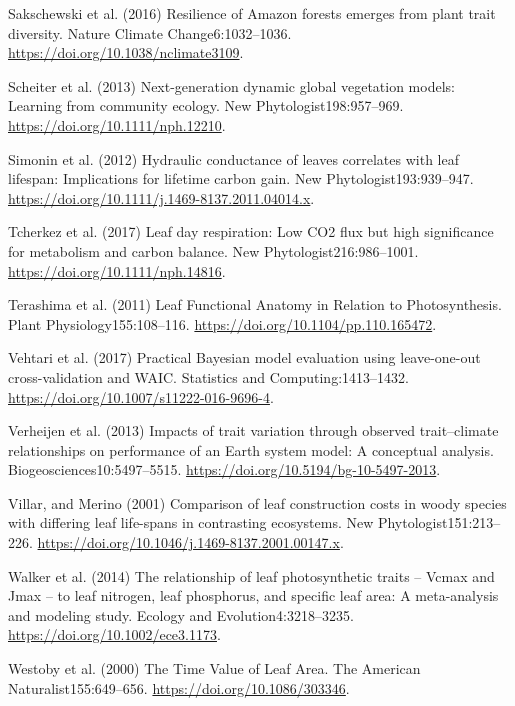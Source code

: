 \documentclass[
  12pt,
  letterpaper,
  DIV=11,
  numbers=noendperiod]{scrartcl}
\newlength{\cslhangindent}
\newenvironment{CSLReferences}[2] %
 {\begin{list}{}{%
  \setlength{\itemindent}{0pt}
  \setlength{\leftmargin}{0pt}
  \setlength{\parsep}{0pt}
  \ifodd #1
   \setlength{\leftmargin}{\cslhangindent}
   \setlength{\itemindent}{-1\cslhangindent}
  \fi
  \setlength{\itemsep}{#2\baselineskip}}}
 {\end{list}}
\begin{document}
\begin{CSLReferences}{1}{1}
Sakschewski et al. (2016) Resilience of {Amazon} forests emerges from
plant trait diversity. Nature Climate Change6:1032--1036.
\url{https://doi.org/10.1038/nclimate3109}.

Scheiter et al. (2013) Next-generation dynamic global vegetation models:
{Learning} from community ecology. New Phytologist198:957--969.
\url{https://doi.org/10.1111/nph.12210}.

Simonin et al. (2012) Hydraulic conductance of leaves correlates with
leaf lifespan: {Implications} for lifetime carbon gain. New
Phytologist193:939--947.
\url{https://doi.org/10.1111/j.1469-8137.2011.04014.x}.

Tcherkez et al. (2017) Leaf day respiration: Low {CO2} flux but high
significance for metabolism and carbon balance. New
Phytologist216:986--1001. \url{https://doi.org/10.1111/nph.14816}.

Terashima et al. (2011) Leaf {Functional Anatomy} in {Relation} to
{Photosynthesis}. Plant Physiology155:108--116.
\url{https://doi.org/10.1104/pp.110.165472}.

Vehtari et al. (2017) Practical {Bayesian} model evaluation using
leave-one-out cross-validation and {WAIC}. Statistics and
Computing:1413--1432. \url{https://doi.org/10.1007/s11222-016-9696-4}.

Verheijen et al. (2013) Impacts of trait variation through observed
trait--climate relationships on performance of an {Earth} system model:
A conceptual analysis. Biogeosciences10:5497--5515.
\url{https://doi.org/10.5194/bg-10-5497-2013}.

Villar, and Merino (2001) Comparison of leaf construction costs in woody
species with differing leaf life-spans in contrasting ecosystems. New
Phytologist151:213--226.
\url{https://doi.org/10.1046/j.1469-8137.2001.00147.x}.

Walker et al. (2014) The relationship of leaf photosynthetic traits --
{Vcmax} and {Jmax} -- to leaf nitrogen, leaf phosphorus, and specific
leaf area: A meta-analysis and modeling study. Ecology and
Evolution4:3218--3235. \url{https://doi.org/10.1002/ece3.1173}.

Westoby et al. (2000) The {Time Value} of {Leaf Area}. The American
Naturalist155:649--656. \url{https://doi.org/10.1086/303346}.


\end{CSLReferences}
\end{document}
